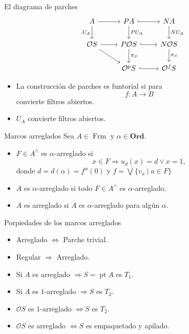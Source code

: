 \documentclass[compress,12pt]{beamer}
\DeclareMathOperator{\pt}{pt}
\DeclareMathOperator{\Frm}{Frm}
\begin{document}
\begin{frame}[fragile]{El diagrama de parches}
\begin{equation}\label{Diagrama de parches}
\begin{tikzcd}
	A & PA & NA \\
	{\mathcal{O}S} & {P\mathcal{O}S} & {N\mathcal{O}S} \\
	& {\mathcal{O}^pS} & {\mathcal{O}^fS}
	\arrow[from=1-1, to=1-2]
	\arrow["{U_A}"', from=1-1, to=2-1]
	\arrow[hook, from=1-2, to=1-3]
	\arrow["{PU_A}", from=1-2, to=2-2]
	\arrow["{NU_A}", from=1-3, to=2-3]
	\arrow[from=2-1, to=2-2]
	\arrow[from=2-1, to=3-2]
	\arrow[hook, from=2-2, to=2-3]
	\arrow["{\pi_S}", from=2-2, to=3-2]
	\arrow["{\sigma_S}", from=2-3, to=3-3]
	\arrow[hook, from=3-2, to=3-3]
\end{tikzcd}
\end{equation}
\begin{itemize}
	\item<2-> La construcción de parches es funtorial si para
\[
f\colon A\to B
\]
convierte filtros abiertos.
\item<3-> $U_A$ convierte filtros abiertos.
\end{itemize}
\end{frame}

\begin{frame}{Marcos arreglados}
Sea $A\in \Frm$ y $\alpha\in \mathbf{Ord}$. 
    \begin{itemize}
        \item<2-> $F\in A^\wedge$ es $\alpha$-arreglado si 
    \[
    x\in F\Rightarrow u_d(x)=d\vee x=1,
    \]
    donde $d=d(\alpha)=f^\alpha(0)$ y $f=\dot{\bigvee}\{v_a\mid a\in F\}$
    \item<3-> $A$ es $\alpha$-arreglado si todo $F\in A^\wedge$ es $\alpha$-arreglado.
    \item<4-> $A$ es arreglado si $A$ es $\alpha$-arreglado para algún $\alpha$.
    \end{itemize}
\end{frame}

\begin{frame}{Porpiedades de los marcos arreglados}
\begin{itemize}
	\item Arreglado $\Leftrightarrow$ Parche trivial.
	\item<2-> Regular $\Rightarrow$ Arreglado.
	\item<3-> Si $A$ es arreglado $\Rightarrow S=\pt A$ es $T_1$.
	\item<4-> Si $A$ es $1$-arreglado $\Rightarrow S$ es $T_2$.
	\item<5-> $\mathcal{O}S$ es $1$-arreglado $\Leftrightarrow S$ es $T_2$.
	\item<6-> $\mathcal{O}S$ es arreglado $\Leftrightarrow S$ es empaquetado y apilado.  
\end{itemize}
\end{frame}
\end{document}

